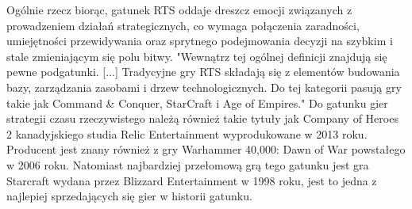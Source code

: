 Ogólnie rzecz biorąc, gatunek RTS oddaje dreszcz emocji związanych z prowadzeniem działań strategicznych, co wymaga połączenia zaradności,
umiejętności przewidywania oraz sprytnego podejmowania decyzji na szybkim i stale zmieniającym się polu bitwy.
"Wewnątrz tej ogólnej definicji znajdują się pewne podgatunki. [...] Tradycyjne gry RTS składają się z elementów budowania bazy, zarządzania zasobami i drzew technologicznych. Do tej kategorii pasują gry takie jak Command \& Conquer, StarCraft i Age of Empires."\cite{stateoftherts}
Do gatunku gier strategii czasu rzeczywistego należą również takie tytuły jak Company of Heroes 2 kanadyjskiego studia 
Relic Entertainment wyprodukowane w 2013 roku. Producent jest znany również z gry Warhammer 40,000: Dawn of War powstałego w 2006 roku.
Natomiast najbardziej przełomową grą tego gatunku jest gra Starcraft wydana przez Blizzard Entertainment w 1998 roku, jest to jedna z najlepiej sprzedających się gier w historii gatunku\cite{rtslist}.
